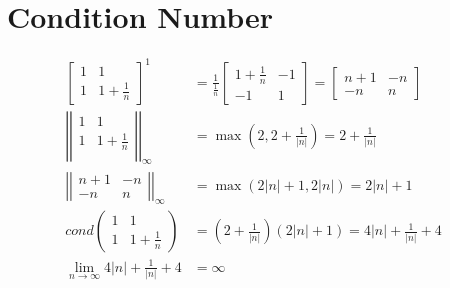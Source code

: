 \section{Condition Number}
	
	\begin{align}
		\begin{bmatrix}
			1 & 1 \\
			1 & 1+\frac{1}{n}
		\end{bmatrix}^{1}
		&=
		\frac{1}{\frac{1}{n}}
		\begin{bmatrix}
			1+\frac{1}{n} & -1 \\
			-1 & 1
		\end{bmatrix}
		=
		\begin{bmatrix}
			n + 1 & -n \\
			-n & n
		\end{bmatrix}
		& \\
		\left|\left|
		\begin{matrix}
			1 & 1 \\
			1 & 1+\frac{1}{n} \\
		\end{matrix}
		\right|\right|_{\infty}
		&=
		\max \left( 2, 2 + \frac{1}{|n|} \right)
		= 2 + \frac{1}{|n|}
		& \\
		\left|\left|
		\begin{matrix}
			n + 1 & -n \\
			-n & n
		\end{matrix}
		\right|\right|_{\infty}
		&=
		\max \left( 2|n| + 1, 2|n| \right)
		= 2|n| + 1
		& \\
		cond\left(
		\begin{matrix}
			1 & 1 \\
			1 & 1+\frac{1}{n}
		\end{matrix}\right)
		&=
		\left( 2 + \frac{1}{|n|} \right)
		(2|n| + 1)
		=
		4|n| + \frac{1}{|n|} + 4 
		& \\
		\lim_{n \to \infty} 4|n| + \frac{1}{|n|} + 4
		&= \infty&
	\end{align}
